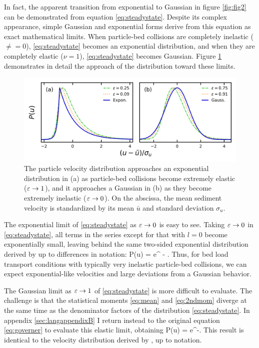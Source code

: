 In fact, the apparent transition from exponential to Gaussian in figure \ref{fig:fig2} can be demonstrated from equation \ref{eq:steadystate}. Despite its complex appearance, simple Gaussian and exponential forms derive from this equation as exact mathematical limits.
When particle-bed collisions are completely inelastic ($\ne = 0$), \ref{eq:steadystate} becomes an exponential distribution, and when they are completely elastic ($\nu = 1$), \ref{eq:steadystate} becomes Gaussian.
Figure \ref{fig:fig3} demonstrates in detail the approach of the distribution toward these limits.
\begin{figure}
	\centerline{\includegraphics{./figures/ch5/Fig3asymptotic.png}}
	\caption{The particle velocity distribution approaches an exponential distribution in (a) as particle-bed collisions become extremely elastic ($\varepsilon \rightarrow 1$), and it approaches a Gaussian in (b) as they become extremely inelastic ($\varepsilon \rightarrow 0$). On the abscissa, the mean sediment velocity is standardized by its mean $\bar{u}$ and standard deviation $\sigma_u$. }
	\label{fig:fig3}
\end{figure}

The exponential limit of \ref{eq:steadystate} as $\varepsilon \rightarrow 0$ is easy to see. Taking $\varepsilon \rightarrow 0 $ in \ref{eq:steadystate}, all terms in the series except for that with $l=0$ become exponentially small, leaving behind the same two-sided exponential distribution derived by \cite{Fan2014} up to differences in notation:
\be P(u) = e^{ - }. \ee
Thus, for bed load transport conditions with typically very inelastic particle-bed collisions, we can expect exponential-like velocities and large deviations from a Gaussian behavior.

The Gaussian limit as $\varepsilon \rightarrow 1$ of \ref{eq:steadystate} is more difficult to evaluate. The challenge is that the statistical moments \ref{eq:mean} and \ref{eq:2ndmom} diverge at the same time as the denominator factors of the distribution \ref{eq:steadystate}. In appendix \ref{sec:langappendixB} I return instead to the original equation \ref{eq:governer} to evaluate this elastic limit, obtaining
\be P(u) = e^{-}. \label{eq:gaussian}\ee
This result is identical to the velocity distribution derived by \citet{Ancey2014}, up to notation.

